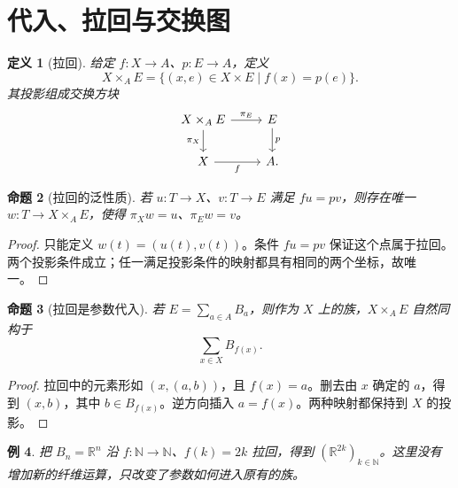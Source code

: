 \documentclass[12pt,oneside,openany,fontset=none]{ctexbook}
\theoremstyle{cn}
\newtheorem{definition}{定义}[chapter]
\newtheorem{example}[definition]{例}
\newtheorem{proposition}[definition]{命题}
\numberwithin{equation}{chapter}
\newcommand{\N}{\mathbb N}
\newcommand{\R}{\mathbb R}
\begin{document}
\section{代入、拉回与交换图}
\begin{definition}[拉回]
给定 $f:X\to A$、$p:E\to A$，定义
\[
X\times_AE=\{(x,e)\in X\times E\mid f(x)=p(e)\}.
\]
其投影组成交换方块
\[
\begin{tikzcd}
X\times_AE\ar[r,"\pi_E"]\ar[d,"\pi_X"']&E\ar[d,"p"]\\
X\ar[r,"f"']&A.
\end{tikzcd}
\]
\end{definition}
\begin{proposition}[拉回的泛性质]
若 $u:T\to X$、$v:T\to E$ 满足 $fu=pv$，则存在唯一 $w:T\to X\times_AE$，使得 $\pi_Xw=u$、$\pi_Ew=v$。
\end{proposition}
\begin{proof}
只能定义 $w(t)=(u(t),v(t))$。条件 $fu=pv$ 保证这个点属于拉回。两个投影条件成立；任一满足投影条件的映射都具有相同的两个坐标，故唯一。
\end{proof}
\begin{proposition}[拉回是参数代入]
若 $E=\sum_{a\in A}B_a$，则作为 $X$ 上的族，$X\times_AE$ 自然同构于
\[
\sum_{x\in X}B_{f(x)}.
\]
\end{proposition}
\begin{proof}
拉回中的元素形如 $(x,(a,b))$，且 $f(x)=a$。删去由 $x$ 确定的 $a$，得到 $(x,b)$，其中 $b\in B_{f(x)}$。逆方向插入 $a=f(x)$。两种映射都保持到 $X$ 的投影。
\end{proof}
\begin{example}
把 $B_n=\R^n$ 沿 $f:\N\to\N$、$f(k)=2k$ 拉回，得到 $(\R^{2k})_{k\in\N}$。这里没有增加新的纤维运算，只改变了参数如何进入原有的族。
\end{example}
\end{document}
